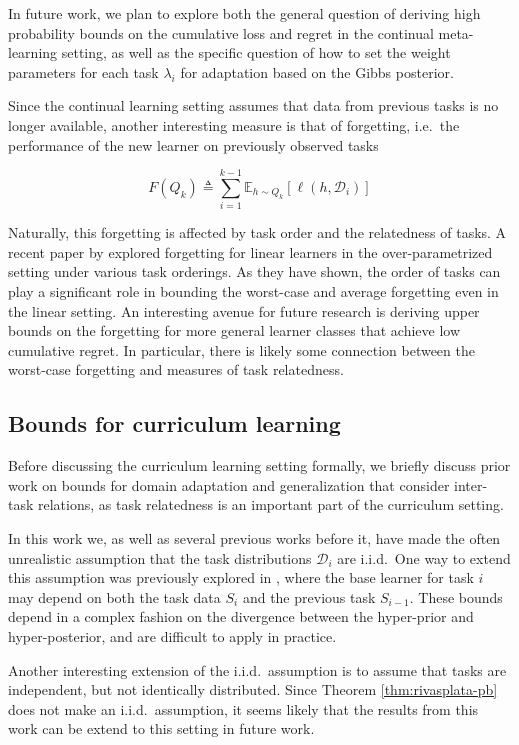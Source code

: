 \documentclass{article}
\theoremstyle{definition}
\newcommand{\Expect}[2]{\mathbb{E}_{#1}\left [#2 \right ]}
\begin{document}
In future work, we plan to explore both the general question of deriving high probability bounds on the cumulative loss and regret in the continual meta-learning setting, as well as the specific question of how to set the weight parameters for each task $\lambda_i$ for adaptation based on the Gibbs posterior. 

Since the continual learning setting assumes that data from previous tasks is no longer available, another interesting measure is that of forgetting, i.e.\ the performance of the new learner on previously observed tasks

$$F(Q_k)\triangleq \sum_{i=1}^{k-1}\Expect{h\sim Q_k}{\ell(h, \mathcal{D}_i)}$$

Naturally, this forgetting is affected by task order and the relatedness of tasks. A recent paper by \citet{Evron2022} explored forgetting for linear learners in the over-parametrized setting under various task orderings. 
As they have shown, the order of tasks can play a significant role in bounding the worst-case and average forgetting even in the linear setting.
An interesting avenue for future research is deriving upper bounds on the forgetting for more general learner classes that achieve low cumulative regret. In particular, there is likely some connection between the worst-case forgetting and measures of task relatedness.

\subsection{Bounds for curriculum learning} 

Before discussing the curriculum learning setting formally, we briefly discuss prior work on bounds for domain adaptation and generalization that consider inter-task relations, as task relatedness is an important part of the curriculum setting.

In this work we, as well as several previous works \citep{Amit2018, Rothfuss2020, Farid2021} before it, have made the often unrealistic assumption that the task distributions $\mathcal{D}_i$ are i.i.d.\
One way to extend this assumption was previously explored in \citet{Pentina2015a}, where the base learner for task $i$ may depend on both the task data $S_i$ and the previous task $S_{i-1}$. These bounds depend in a complex fashion on the divergence between the hyper-prior and hyper-posterior, and are difficult to apply in practice.

Another interesting extension of the i.i.d.\ assumption is to assume that tasks are independent, but not identically distributed. Since Theorem \ref{thm:rivasplata-pb} \citep{Rivasplata2020} does not make an i.i.d.\ assumption, it seems likely that the results from this work can be extend to this setting in future work.
\end{document}

